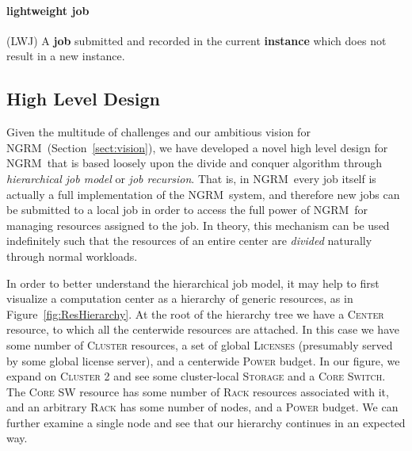 \documentclass{article}
\newcommand{\ngrm}{NGRM}
\begin{document}
\paragraph{lightweight job} (LWJ) 
A {\bf job} submitted and recorded in the current {\bf instance}
which does not result in a new instance.

\subsection{High Level Design}

Given the multitude of challenges and our ambitious vision for
\ngrm\ (Section~\ref{sect:vision}), we have developed a novel
high level design for \ngrm\ that is based loosely upon the
divide and conquer algorithm through {\em hierarchical job model}
or {\em job recursion}. That
is, in \ngrm\ every job itself is actually a full implementation
of the \ngrm\ system, and therefore new jobs can be submitted to a
local job in order to access the full power of \ngrm\ for managing
resources assigned to the job. In theory, this mechanism can be
used indefinitely such that the resources of an entire center
are {\em divided} naturally through normal workloads.  

In order to better understand the hierarchical job model, it may help
to first visualize a computation center as a hierarchy
of generic resources, as in Figure~\ref{fig:ResHierarchy}. At
the root of the hierarchy tree we have a \textsc{Center} resource,
to which all the centerwide resources are attached.
In this case we have some number of \textsc{Cluster} resources,
a set of global \textsc{Licenses} (presumably served by some global
license server), and a centerwide \textsc{Power} budget. In our figure,
we expand on \textsc{Cluster 2} and see some cluster-local
\textsc{Storage} and a \textsc{Core Switch}.  The \textsc{Core SW}
resource has some number of \textsc{Rack} resources associated
with it, and an arbitrary \textsc{Rack} has some number of nodes,
and a \textsc{Power} budget. We can further examine a single node
and see that our hierarchy continues in an expected way.
\end{document}
